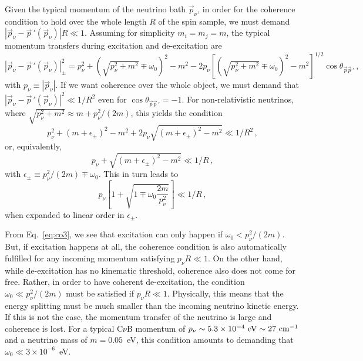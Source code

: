 \documentclass[aps,prd,10pt,twocolumn,superscriptaddress,floatfix,nofootinbib,amsmath,amssymb,altaffilletter,preprintnumbers]{revtex4-1}
\begin{document}
Given the typical momentum of the neutrino bath $\vec{p}_\nu$, in order for the coherence condition to hold over the whole length $R$ of the spin sample, we must demand $|\vec{p}_\nu-\vec{p}\,'(\vec{p}_\nu)|R\ll1$. Assuming for simplicity $m_i=m_j=m$, the typical momentum transfers during excitation and de-excitation are 
\begin{equation}
    |\vec{p}_\nu-\vec{p}\,'(\vec{p}_\nu)|^2_\pm=p_\nu^2+(\sqrt{p_\nu^2+m^2}\mp\omega_0)^2-m^2-2p_\nu\left[(\sqrt{p_\nu^2+m^2}\mp\omega_0)^2-m^2\right]^{1/2}\cos{\theta_{\vec{p}\vec{p}\,'}}\,,
    \label{eq:co}
\end{equation}
with $p_{\nu} \equiv|\vec{p}_{\nu}|$.
 If we want coherence over the whole object, we must demand that $|\vec{p}_\nu-\vec{p}\,'(\vec{p}_\nu)|^2 \ll 1/R^2$ even for $\cos \theta_{\vec{p}\vec{p}\,'} = -1$.  
For non-relativistic neutrinos, where $\sqrt{p_\nu^2+m^2} \approx m + p_\nu^2/(2 m)$, 
this yields the condition
\begin{equation}
    p_\nu^2+(m+\epsilon_\pm)^2-m^2+2p_\nu\sqrt{(m+\epsilon_\pm)^2-m^2}\ll1/R^2\,,
\end{equation}
or, equivalently,
\begin{equation}
    p_\nu+\sqrt{(m+\epsilon_\pm)^2-m^2}\ll1/R\,,
    \label{eq:co2}
\end{equation}
with $\epsilon_\pm \equiv p_\nu^2/(2m) \mp \omega_0$.  This in turn leads to
\begin{equation}
    p_\nu \left[1+ \sqrt{1\mp \omega_0 \frac{2 m}{p_\nu^2}} \right]\ll1/R\,,
    \label{eq:co3}
\end{equation}
when expanded to linear order in $\epsilon_\pm$.

From Eq.~\eqref{eq:co3}, we see that excitation can only happen if $\omega_0< p_\nu^2/(2m)$.  But, if excitation happens at all, the coherence condition is also automatically fulfilled for any incoming momentum satisfying $p_\nu R\ll 1$. 
On the other hand, while de-excitation has no kinematic threshold, coherence also does not come for free. Rather, in order to have coherent de-excitation, the condition  $\omega_0\ll p_\nu^2/(2m)$ must be satisfied if $p_\nu R \ll 1$.  Physically, this means that the energy splitting must be much smaller than the incoming neutrino kinetic energy. If this is not the case, the momentum transfer of the neutrino is large and coherence is lost.    For a typical C$\nu$B momentum of $p_\nu \sim 5.3 \times 10^{-4}~{\rm eV} \sim 27~{\rm cm}^{-1}$ and a neutrino mass of $m=0.05$~eV, this condition amounts to demanding that $\omega_0 \ll 3 \times 10^{-6}$~eV. 
\end{document}

